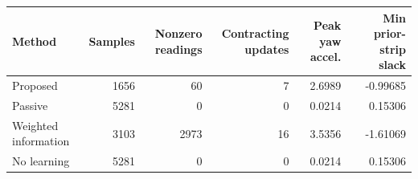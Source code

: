 \begin{tabular}{lrrrrr}
\toprule
Method & Samples & Nonzero readings & Contracting updates & Peak yaw accel. & Min prior-strip slack \\
\midrule
Proposed & 1656 & 60 & 7 & 2.6989 & -0.99685 \\
Passive & 5281 & 0 & 0 & 0.0214 & 0.15306 \\
Weighted information & 3103 & 2973 & 16 & 3.5356 & -1.61069 \\
No learning & 5281 & 0 & 0 & 0.0214 & 0.15306 \\
\bottomrule
\end{tabular}
